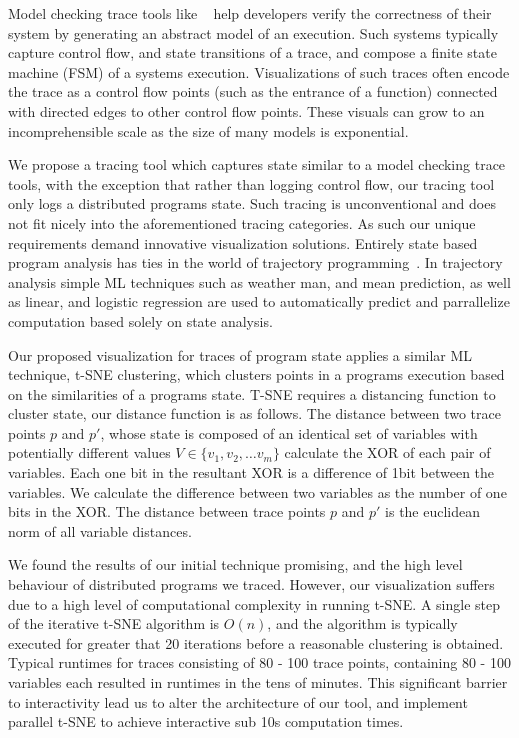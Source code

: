 Model checking trace tools like
~\cite{Beschastnikh:2014:IMC:2568225:2568246,Barham03magpie:online,Walker98visualizingdynamic}
help developers verify the correctness of their system by generating an
abstract model of an execution. Such systems typically capture control
flow, and state transitions of a trace, and compose a finite state
machine (FSM) of a systems execution. Visualizations of such traces
often encode the trace as a control flow points (such as the entrance
of a function) connected with directed edges to other control flow
points. These visuals can grow to an incomprehensible scale as the
size of many models is exponential.

We propose a tracing tool which captures state similar to a model
checking trace tools, with the exception that rather than logging
control flow, our tracing tool only logs a distributed programs state.
Such tracing is unconventional and does not fit nicely into the
aforementioned tracing categories. As such our unique requirements
demand innovative visualization solutions. Entirely state based program
analysis has ties in the world of trajectory
programming~\cite{Waterland:2014:AAS:2654822.2541985,181250,Waterland:2013:CC:2485732.2485749}.
In trajectory analysis simple ML techniques such as weather man, and
mean prediction, as well as linear, and logistic regression are used
to automatically predict and parrallelize computation based solely on
state analysis.

Our proposed visualization for traces of program state applies a
similar ML technique, t-SNE clustering, which clusters points in a
programs execution based on the similarities of a programs state.
T-SNE requires a distancing function to cluster state, our distance
function is as follows. The distance between two trace points $p$ and
$p'$, whose state is composed of an identical set of variables with
potentially different values $V \in \{v_1, v_2, \dots v_m\}$ calculate the XOR
of each pair of variables. Each one bit in the resultant XOR is a
difference of 1bit between the variables. We calculate the difference
between two variables as the number of one bits in the XOR. The
distance between trace points $p$ and $p'$ is the euclidean norm of
all variable distances.

We found the results of our initial technique promising, and the high
level behaviour of distributed programs we traced. However, our
visualization suffers due to a high level of computational complexity
in running t-SNE. A single step of the iterative t-SNE algorithm is
$O(n)$, and the algorithm is typically executed for greater that 20
iterations before a reasonable clustering is obtained. Typical
runtimes for traces consisting of 80 - 100 trace points, containing 80
- 100 variables each resulted in runtimes in the tens of minutes. This
significant barrier to interactivity lead us to alter the architecture
of our tool, and implement parallel t-SNE to achieve interactive sub
10s computation times.

